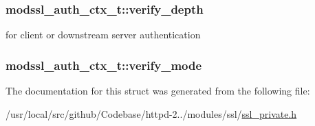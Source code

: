 \subsubsection[{\texorpdfstring{verify\+\_\+depth}{verify_depth}}]{ modssl\+\_\+auth\+\_\+ctx\+\_\+t\+::verify\+\_\+depth}\hypertarget{structmodssl__auth__ctx__t_ab1486d9b2a656743afb44f3fc70401d5}{}\label{structmodssl__auth__ctx__t_ab1486d9b2a656743afb44f3fc70401d5}
for client or downstream server authentication 
\subsubsection[{\texorpdfstring{verify\+\_\+mode}{verify_mode}}]{ modssl\+\_\+auth\+\_\+ctx\+\_\+t\+::verify\+\_\+mode}\hypertarget{structmodssl__auth__ctx__t_a47d63b1be7c8c677b90d2787f0f8dc00}{}\label{structmodssl__auth__ctx__t_a47d63b1be7c8c677b90d2787f0f8dc00}


The documentation for this struct was generated from the following file\+:\begin{DoxyCompactItemize}
\item 
/usr/local/src/github/\+Codebase/httpd-\/2../modules/ssl/\hyperlink{ssl__private_8h}{ssl\+\_\+private.\+h}\end{DoxyCompactItemize}

